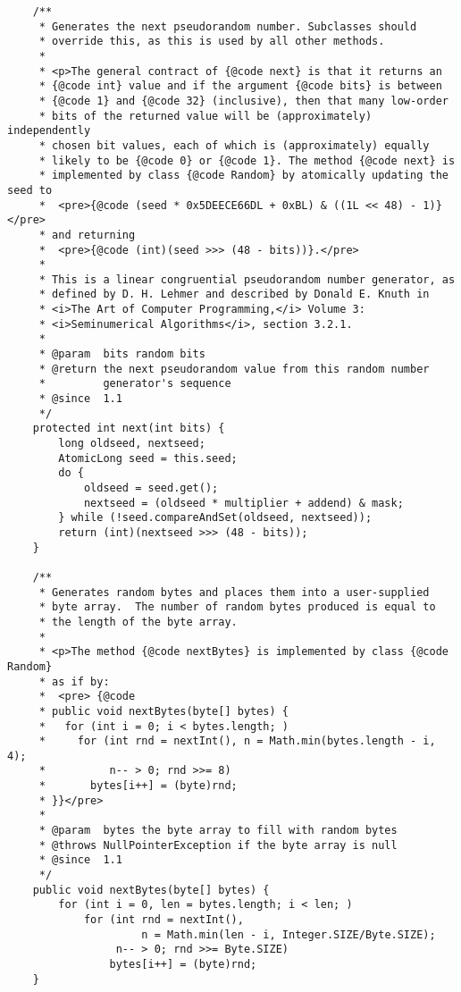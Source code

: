 \documentclass[12pt,a4paper,twoside,openright,titlepage,final]{article}
\begin{document}
\begin{verbatim}
    /**
     * Generates the next pseudorandom number. Subclasses should
     * override this, as this is used by all other methods.
     *
     * <p>The general contract of {@code next} is that it returns an
     * {@code int} value and if the argument {@code bits} is between
     * {@code 1} and {@code 32} (inclusive), then that many low-order
     * bits of the returned value will be (approximately) independently
     * chosen bit values, each of which is (approximately) equally
     * likely to be {@code 0} or {@code 1}. The method {@code next} is
     * implemented by class {@code Random} by atomically updating the seed to
     *  <pre>{@code (seed * 0x5DEECE66DL + 0xBL) & ((1L << 48) - 1)}</pre>
     * and returning
     *  <pre>{@code (int)(seed >>> (48 - bits))}.</pre>
     *
     * This is a linear congruential pseudorandom number generator, as
     * defined by D. H. Lehmer and described by Donald E. Knuth in
     * <i>The Art of Computer Programming,</i> Volume 3:
     * <i>Seminumerical Algorithms</i>, section 3.2.1.
     *
     * @param  bits random bits
     * @return the next pseudorandom value from this random number
     *         generator's sequence
     * @since  1.1
     */
    protected int next(int bits) {
        long oldseed, nextseed;
        AtomicLong seed = this.seed;
        do {
            oldseed = seed.get();
            nextseed = (oldseed * multiplier + addend) & mask;
        } while (!seed.compareAndSet(oldseed, nextseed));
        return (int)(nextseed >>> (48 - bits));
    }

    /**
     * Generates random bytes and places them into a user-supplied
     * byte array.  The number of random bytes produced is equal to
     * the length of the byte array.
     *
     * <p>The method {@code nextBytes} is implemented by class {@code Random}
     * as if by:
     *  <pre> {@code
     * public void nextBytes(byte[] bytes) {
     *   for (int i = 0; i < bytes.length; )
     *     for (int rnd = nextInt(), n = Math.min(bytes.length - i, 4);
     *          n-- > 0; rnd >>= 8)
     *       bytes[i++] = (byte)rnd;
     * }}</pre>
     *
     * @param  bytes the byte array to fill with random bytes
     * @throws NullPointerException if the byte array is null
     * @since  1.1
     */
    public void nextBytes(byte[] bytes) {
        for (int i = 0, len = bytes.length; i < len; )
            for (int rnd = nextInt(),
                     n = Math.min(len - i, Integer.SIZE/Byte.SIZE);
                 n-- > 0; rnd >>= Byte.SIZE)
                bytes[i++] = (byte)rnd;
    }


\end{verbatim}
\end{document}
